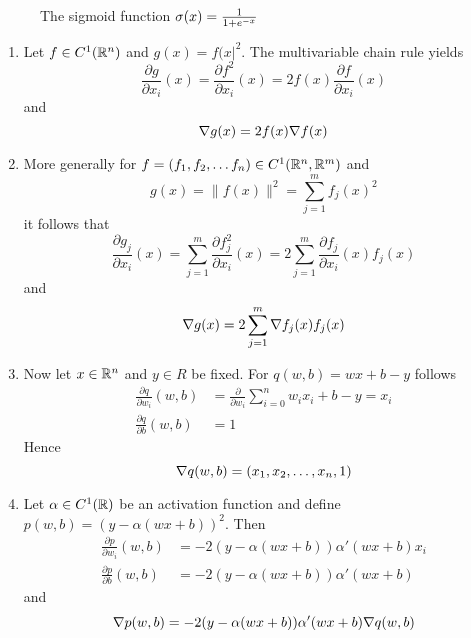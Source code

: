 \begin{figure}[H]
    \centering
    \plotsigmoid{}
    \caption{The sigmoid function \( \sigma(x) = \frac{1}{1 + e^{-x}} \)}\label{fig:sigmoid}
\end{figure}
\bigskip

\begin{remarks}
    \hfill
    \begin{enumerate}
        \item Let \( f \in C^1(\mathbb{R}^n) \) and \( g(x) = f(x|^2 \). The multivariable  chain rule yields
              \[
                  \frac{\partial g}{\partial x_i}(x)
                  = \frac{\partial f^2}{\partial x_i}(x)
                  = 2 f(x) \frac{\partial f}{\partial x_i}(x)
              \]
              and
              \[
                  \nabla g(x) = 2 f(x) \nabla f(x)
              \]
        \item More generally for \( f = (f_1, f_2, \dots f_n)\in C^1(\mathbb{R}^n,\mathbb{R}^m) \) and
              \[
                  g(x) = \|f(x)\|^2 = \sum_{j = 1}^m {f_j(x)}^2
              \]
              it follows that
              \[
                  \frac{\partial g_j}{\partial x_i}(x)
                  = \sum_{j = 1}^m \frac{\partial f_j^2}{\partial x_i}(x)
                  = 2 \sum_{j = 1}^m \frac{\partial f_j}{\partial x_i}(x) f_j(x)
              \]
              and
              \[
                  \nabla g(x) = 2 \sum_{j = 1}^m \nabla f_j(x) f_j(x)
              \]
        \item Now let \( x \in \mathbb{R}^n \) and \( y \in R \) be fixed. For \( q(w, b) = wx + b - y \) follows
              \[
                  \begin{split}
                      \frac{\partial q}{\partial w_i}(w, b) &=
                      \frac{\partial}{\partial w_i} \sum_{i = 0}^n w_i x_i + b - y = x_i \\
                      \frac{\partial q}{\partial b}(w, b) &= 1
                  \end{split}
              \]
              Hence
              \[
                  \nabla q(w, b) = (x_1, x_2, \dots, x_n, 1)
              \]
        \item Let \( \alpha \in C^1(\mathbb{R}) \) be an activation function and define
              \( p(w,b) = (y - \alpha(wx + b))^2 \).
              Then
              \[
                  \begin{split}
                      \frac{\partial p}{\partial w_i}(w, b) &= -2 (y - \alpha(wx + b)) \alpha'(wx + b) x_i  \\
                      \frac{\partial p}{\partial b}(w, b) &= -2 (y - \alpha(wx + b)) \alpha'(wx + b)
                  \end{split}
              \]
              and
              \[
                  \nabla p(w, b) = -2 (y - \alpha(wx + b)) \alpha'(wx + b)\nabla q(w, b)
              \]
    \end{enumerate}
\end{remarks}
\bigskip


